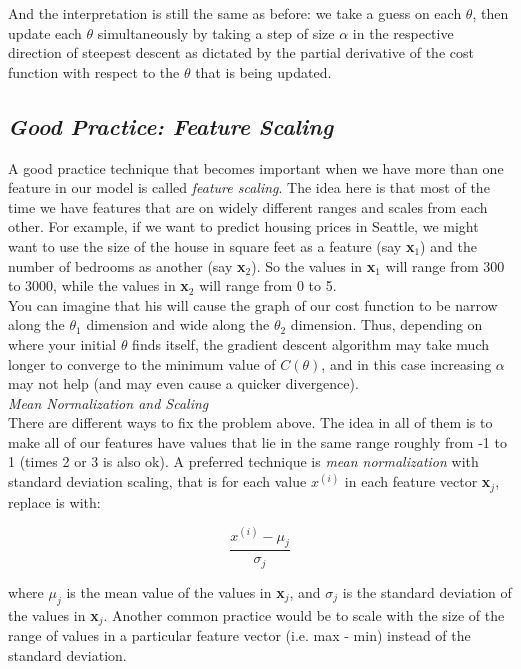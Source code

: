 \documentclass[11pt,a4paper,oneside]{report}
\begin{document}
And the interpretation is still the same as before: we take a guess on each $\theta$, then update each $\theta$ simultaneously by taking a step of size $\alpha$ in the respective direction of steepest descent as dictated by the partial derivative of the cost function with respect to the $\theta$ that is being updated.\\


{\center\color{magenta}
\subsection*{\it\huge Good Practice: Feature Scaling}}

A good practice technique that becomes important when we have more than one feature in our model is called \emph{feature scaling}. The idea here is that most of the time we have features that are on widely different ranges and scales from each other. For example, if we want to predict housing prices in Seattle, we might want to use the size of the house in square feet as a feature (say {\bf x}$_1$) and the number of bedrooms as another (say {\bf x}$_2$). So the values in {\bf x}$_1$ will range from 300 to 3000, while the values in {\bf x}$_2$ will range from 0 to 5.\\

You can imagine that his will cause the graph of our cost function to be narrow along the $\theta_1$ dimension and wide along the $\theta_2$ dimension. Thus, depending on where your initial $\theta$ finds itself, the gradient descent algorithm may take much longer to converge to the minimum value of $C(\theta)$, and in this case increasing $\alpha$ may not help (and may even cause a quicker divergence). \\

{\it\Large\color{red} Mean Normalization and Scaling}\\

There are different ways to fix the problem above. The idea in all of them is to make all of our features have values that lie in the same range roughly from -1 to 1 (times 2 or 3 is also ok). A preferred technique is \emph{mean normalization} with standard deviation scaling, that is for each value $x^{(i)}$ in each feature vector {\bf x}$_j$, replace is with:

\[ \frac{x^{(i)} - \mu_j}{\sigma_j} \]

where $\mu_j$ is the mean value of the values in {\bf x}$_j$, and $\sigma_j$ is the standard deviation of the values in {\bf x}$_j$. Another common practice would be to scale with the size of the range of values in a particular feature vector (i.e. max - min) instead of the standard deviation.\\
\end{document}

